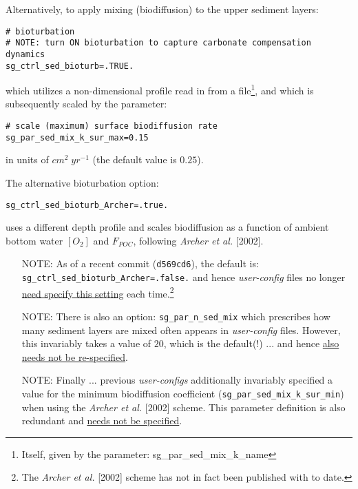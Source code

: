 \begin{enumerate}[noitemsep]
\vspace{1mm}
Alternatively, to apply mixing (biodiffusion) to the upper sediment layers:
\vspace{-1mm}\small\begin{verbatim}
# bioturbation
# NOTE: turn ON bioturbation to capture carbonate compensation dynamics
sg_ctrl_sed_bioturb=.TRUE.
\end{verbatim}\normalsize\vspace{-1mm}
which utilizes a non-dimensional profile read in from a file\footnote{Itself, given by the parameter: sg\_par\_sed\_mix\_k\_name}, and which is subsequently scaled by the parameter:
\vspace{-1mm}\small\begin{verbatim}
# scale (maximum) surface biodiffusion rate
sg_par_sed_mix_k_sur_max=0.15
\end{verbatim}\normalsize\vspace{-1mm}
in units of \(cm^{2}\;yr^{-1}\) (the default value is \(0.25\)).

\vspace{2mm}
The alternative bioturbation option:
\vspace{-1mm}\small\begin{verbatim}
sg_ctrl_sed_bioturb_Archer=.true.
\end{verbatim}\normalsize\vspace{-1mm} 
uses a different depth profile and scales biodiffusion as a function of ambient bottom water \([O_{2}]\) and \(F_{POC}\), following \textit{Archer et al.} [2002].

\begin{itemize}[noitemsep]
\vspace{1mm}
\setlength{\itemindent}{-0.325 in}
\item [NOTE:] As of a recent commit (\texttt{d569cd6}), the default is: \texttt{\small sg\_ctrl\_sed\_bioturb\_Archer=.false.} and hence \textit{user-config} files no longer \uline{need specify this setting} each time.\footnote{The \textit{Archer et al.} [2002] scheme has not in fact been published with to date.}
\vspace{1mm}
\item [NOTE:] There is also an option: \texttt{sg\_par\_n\_sed\_mix} which prescribes how many sediment layers are mixed often appears in \textit{user-config} files. However, this invariably takes a value of \(20\), which is the default(!) ... and hence \uline{also needs not be re-specified}.
\vspace{1mm}
\item [NOTE:] Finally ... previous \textit{user-configs} additionally invariably specified a value for the minimum biodiffusion coefficient (\texttt{sg\_par\_sed\_mix\_k\_sur\_min}) when using the \textit{Archer et al.} [2002] scheme. This parameter definition is also redundant and \uline{needs not be specified}.
\end{itemize}


\end{enumerate}
